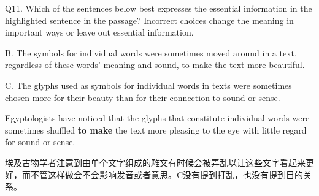 \begin{blk}
    \begin{qst}
        Q11. Which of the sentences below best expresses the essential information in the highlighted sentence in the passage? Incorrect choices change the meaning in important ways or leave out essential information.
    \end{qst}

    \begin{chc}
        B. The symbols for individual words were sometimes moved around in a text, regardless of these words’ meaning and sound, to make the text more beautiful.

        C. The glyphs used as symbols for individual words in texts were sometimes chosen more for their beauty than for their connection to sound or sense.
    \end{chc}

    \begin{psgq}
        Egyptologists have noticed that the glyphs that constitute individual words were sometimes shuffled \textbf{to make} the text more pleasing to the eye with little regard for sound or sense.
    \end{psgq}

    \begin{nlz}
        埃及古物学者注意到由单个文字组成的雕文有时候会被弄乱以让这些文字看起来更好，而不管这样做会不会影响发音或者意思。C没有提到打乱，也没有提到目的关系。
    \end{nlz}
\end{blk}
